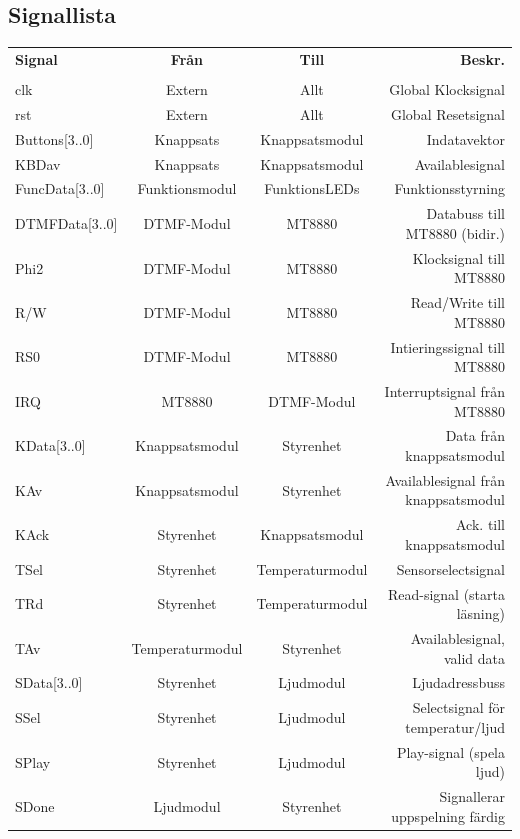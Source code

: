 \documentclass[a4paper,11pt]{article}
\begin{document}
	\subsection{Signallista}
	\begin{tabular}{l c c r}
		\\{\bf Signal} & {\bf Från} & {\bf Till} & {\bf Beskr.}\\ \\
		clk & Extern & Allt & Global Klocksignal\\
		rst & Extern & Allt & Global Resetsignal\\
		Buttons[3..0] & Knappsats & Knappsatsmodul & Indatavektor\\
		KBDav & Knappsats & Knappsatsmodul & Availablesignal\\
		FuncData[3..0] & Funktionsmodul & FunktionsLEDs & Funktionsstyrning\\
		DTMFData[3..0] & DTMF-Modul & MT8880 & Databuss till MT8880 (bidir.)\\
		Phi2 & DTMF-Modul & MT8880 & Klocksignal till MT8880\\
		R/W & DTMF-Modul & MT8880 & Read/Write till MT8880\\
		RS0 & DTMF-Modul & MT8880 & Intieringssignal till MT8880\\
		IRQ & MT8880 & DTMF-Modul & Interruptsignal från MT8880\\

		KData[3..0] & Knappsatsmodul & Styrenhet & Data från knappsatsmodul\\
		KAv & Knappsatsmodul & Styrenhet & Availablesignal från knappsatsmodul\\
		KAck & Styrenhet & Knappsatsmodul & Ack. till knappsatsmodul\\

		TSel & Styrenhet & Temperaturmodul & Sensorselectsignal\\
		TRd & Styrenhet & Temperaturmodul & Read-signal (starta läsning)\\
		TAv & Temperaturmodul & Styrenhet & Availablesignal, valid data\\

		SData[3..0] & Styrenhet & Ljudmodul & Ljudadressbuss\\
		SSel & Styrenhet & Ljudmodul & Selectsignal för temperatur/ljud\\
		SPlay & Styrenhet & Ljudmodul & Play-signal (spela ljud)\\
		SDone & Ljudmodul & Styrenhet & Signallerar uppspelning färdig\\


\end{tabular}
\end{document}
